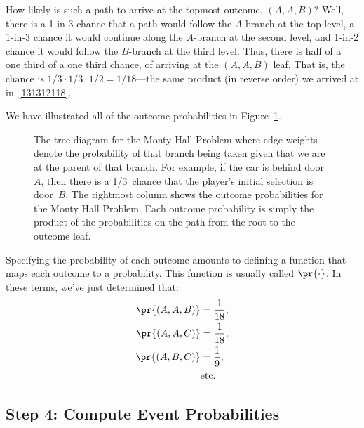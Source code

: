 How likely is such a path to arrive at the topmost outcome, $(A, A,
B)$?  Well, there is a 1-in-3 chance that a path would follow the
$A$-branch at the top level, a 1-in-3 chance it would continue along
the $A$-branch at the second level, and 1-in-2 chance it would follow
the $B$-branch at the third level.  Thus, there is half of a one third
of a one third chance, of arriving at the $(A, A, B)$ leaf.  That is,
the chance is $1/3 \cdot 1/3 \cdot 1/2 = 1/18$---the same product (in
reverse order) we arrived at in~\eqref{131312118}.

We have illustrated all of the outcome probabilities in
Figure~\ref{fig:14A6}.

\begin{figure}


\caption{The tree diagram for the Monty Hall Problem where edge
  weights denote the probability of that branch being taken given that
  we are at the parent of that branch.  For example, if the car is
  behind door~$A$, then there is a 1/3~chance that the player's
  initial selection is door~$B$.
  The rightmost column shows the outcome probabilities for the
  Monty Hall Problem.  Each outcome probability is simply the product
  of the probabilities on the path from the root to
  the outcome leaf.}

\label{fig:14A6}
\end{figure}

Specifying the probability of each outcome amounts to defining a
function that maps each outcome to a probability.  This function is
usually called $\pr{\cdot}$.  In these terms, we've just determined
that:
\begin{align*}
\pr{(A, A, B)} & = \frac{1}{18}, \\
\pr{(A, A, C)} & = \frac{1}{18}, \\
\pr{(A, B, C)} & = \frac{1}{9}, \\
               & \text{etc.}
\end{align*}

\subsection{Step 4: Compute Event Probabilities}

